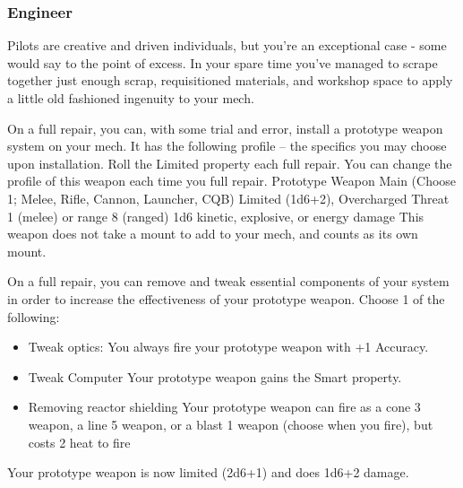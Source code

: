\subsubsection{Engineer}

\begin{talent}
{Pilots are creative and driven individuals, but you’re an exceptional case - some would say to the point of excess. In your spare time you’ve managed to scrape together just enough scrap, requisitioned materials, and workshop space to apply a little old fashioned ingenuity to your mech.}

On a full repair, you can, with some trial and error, install a prototype weapon system on your mech. It has the following profile -- the specifics you may choose upon installation. Roll the Limited property each full repair. You can change the profile of this weapon each time you full repair. 
         Prototype Weapon 
         Main (Choose 1; Melee, Rifle, Cannon, Launcher, CQB) 
         Limited (1d6+2), Overcharged 
         Threat 1 (melee) or range 8 (ranged) 
         1d6 kinetic, explosive, or energy damage 
This weapon does not take a mount to add to your mech, and counts as its own mount.

On a full repair, you can remove and tweak essential components of your system in order to increase the effectiveness of your prototype weapon. 
Choose 1 of the following: 
\begin{itemize}
\item Tweak optics:
     You always fire your prototype weapon with +1 Accuracy. 
\item Tweak Computer 
     Your prototype weapon gains the Smart property. 
\item Removing reactor shielding 
     Your prototype weapon can fire as a cone 3 weapon, a line 5 weapon, or a blast 1 weapon (choose when you fire), but costs 2 heat to fire
\end{itemize}
Your prototype weapon is now limited (2d6+1) and does 1d6+2 damage.
\end{talent}
